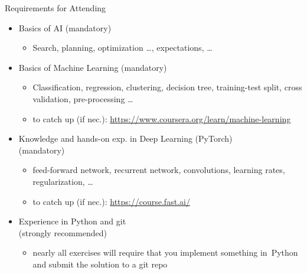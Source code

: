 \begin{frame}[c]{Requirements for Attending}
	
	\begin{itemize}
		\item Basics of \alert{AI} (mandatory)
		\begin{itemize}
			\item Search, planning, optimization \ldots, expectations, \ldots
		\end{itemize}
		\item Basics of \alert{Machine Learning} (mandatory)
		\begin{itemize}
			\item Classification, regression, clustering, decision tree, training-test split, cross validation, pre-processing \ldots
			\item to catch up (if nec.): \url{https://www.coursera.org/learn/machine-learning} 
		\end{itemize}
		\pause
		\item Knowledge and hands-on exp. in \alert{Deep Learning} (PyTorch)\\ (mandatory)
		\begin{itemize}
			\item feed-forward network, recurrent network, convolutions, learning rates, regularization, \ldots 
			\item to catch up (if nec.): \url{https://course.fast.ai/}
		\end{itemize}
		\pause
		\item Experience in \alert{Python and git}\\ (strongly recommended)
		\begin{itemize}
			\item nearly all exercises will require 
			that you implement something in~Python and submit the solution to a git repo
		\end{itemize}
	\end{itemize}
	
\end{frame}
